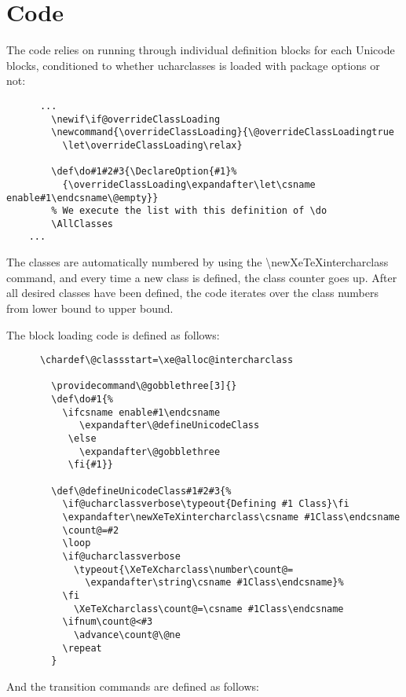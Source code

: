 ﻿\documentclass{article}
\begin{document}
	\section{Code}

		The code relies on running through individual definition blocks for each Unicode blocks, conditioned to whether ucharclasses is loaded with package options or not:

		\pagebreak

		\disableTransitionRules
		\begin{verbatim}
	  ...
		\newif\if@overrideClassLoading
		\newcommand{\overrideClassLoading}{\@overrideClassLoadingtrue
		  \let\overrideClassLoading\relax}

		\def\do#1#2#3{\DeclareOption{#1}%
		  {\overrideClassLoading\expandafter\let\csname enable#1\endcsname\@empty}}
		% We execute the list with this definition of \do
		\AllClasses
  	...
		\end{verbatim}
		\enableTransitionRules

		The classes are automatically numbered by using the \textbackslash newXeTeXintercharclass command, and every time a new class is defined, the class counter goes up. After all desired classes have been defined, the code iterates over the class numbers from lower bound to upper bound.

		The block loading code is defined as follows:

		\disableTransitionRules
		\begin{verbatim}
	  \chardef\@classstart=\xe@alloc@intercharclass

		\providecommand\@gobblethree[3]{}
		\def\do#1{%
		  \ifcsname enable#1\endcsname
		     \expandafter\@defineUnicodeClass
		   \else
		     \expandafter\@gobblethree
		   \fi{#1}}

		\def\@defineUnicodeClass#1#2#3{%
		  \if@ucharclassverbose\typeout{Defining #1 Class}\fi
		  \expandafter\newXeTeXintercharclass\csname #1Class\endcsname
		  \count@=#2
		  \loop
		  \if@ucharclassverbose
		    \typeout{\XeTeXcharclass\number\count@=
		      \expandafter\string\csname #1Class\endcsname}%
		  \fi
		    \XeTeXcharclass\count@=\csname #1Class\endcsname
		  \ifnum\count@<#3
		    \advance\count@\@ne
		  \repeat
		}
		\end{verbatim}
		\enableTransitionRules

		And the transition commands are defined as follows:
\end{document}
